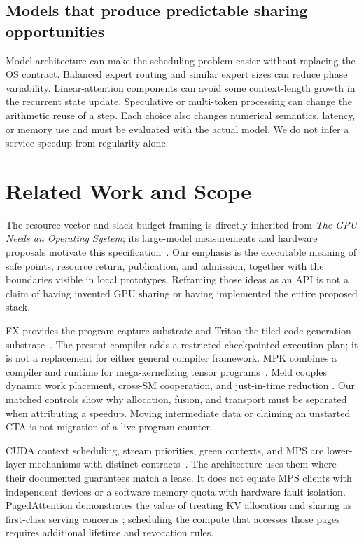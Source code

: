 \subsection{Models that produce predictable sharing opportunities}
Model architecture can make the scheduling problem easier without replacing
the OS contract. Balanced expert routing and similar expert sizes can reduce
phase variability. Linear-attention components can avoid some context-length
growth in the recurrent state update. Speculative or multi-token processing
can change the arithmetic reuse of a step. Each choice also changes numerical
semantics, latency, or memory use and must be evaluated with the actual model.
We do not infer a service speedup from regularity alone.

\section{Related Work and Scope}
\label{sec:related}
The resource-vector and slack-budget framing is directly inherited from
\emph{The GPU Needs an Operating System}; its large-model measurements and
hardware proposals motivate this specification~\cite{Nourai2026GPUOS}.
Our emphasis is the executable meaning of safe points, resource return,
publication, and admission, together with the boundaries visible in local
prototypes. Reframing those ideas as an API is not a claim of having invented
GPU sharing or having implemented the entire proposed stack.

FX provides the program-capture substrate and Triton the tiled code-generation
substrate~\cite{Reed2022FX,Tillet2019Triton}. The present compiler adds a
restricted checkpointed execution plan; it is not a replacement for either
general compiler framework. MPK combines a compiler and runtime for
mega-kernelizing tensor programs~\cite{Cheng2026MPK}. Meld couples dynamic
work placement, cross-SM cooperation, and just-in-time reduction
\cite{He2026Meld}. Our matched controls show why allocation, fusion, and
transport must be separated when attributing a speedup. Moving intermediate
data or claiming an unstarted CTA is not migration of a live program counter.

CUDA context scheduling, stream priorities, green contexts, and MPS are
lower-layer mechanisms with distinct contracts~\cite{CUDAStreams,CUDAGreen,NVIDIAMPS,CUDAComputePreemption}.
The architecture uses them where their documented guarantees match a lease.
It does not equate MPS clients with independent devices or a software memory
quota with hardware fault isolation. PagedAttention demonstrates the value
of treating KV allocation and sharing as first-class serving concerns
\cite{Kwon2023PagedAttention}; scheduling the compute that accesses those
pages requires additional lifetime and revocation rules.

